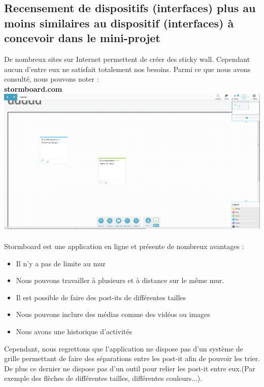 \documentclass{article}
\begin{document}
\subsection{Recensement de dispositifs (interfaces) plus au moins similaires au dispositif (interfaces) à concevoir dans le mini-projet}
\hspace*{0.6cm}De nombreux sites sur Internet permettent de créer des sticky wall. Cependant aucun d'entre eux ne satisfait totalement nos besoins. Parmi ce que nous avons consulté, nous pouvons noter :\\

\textbf{stormboard.com}
\vspace{0.2cm}\\
\includegraphics[width=\textwidth]{2}\\
\vspace{0.2cm}\\
Stormboard est une application en ligne et présente de nombreux avantages :
\begin{itemize}
  \item Il n'y a pas de limite au mur
  \item Nous pouvons travailler à plusieurs et à distance sur le même mur. 
  \item Il est possible de faire des post-its de différentes tailles
  \item Nous pouvons inclure des médias comme des vidéos ou images
  \item Nous avons une historique d'activités
\end{itemize}
\vspace{0.2cm}
\hspace*{0.6cm}Cependant, nous regrettons que l'application ne dispose pas d'un système de grille permettant de faire des séparations entre les post-it afin de pouvoir les trier. De plus ce dernier ne dispose pas d'un outil pour relier les post-it entre eux.(Par exemple des flèches de différentes tailles, différentes couleurs...).
\end{document}
